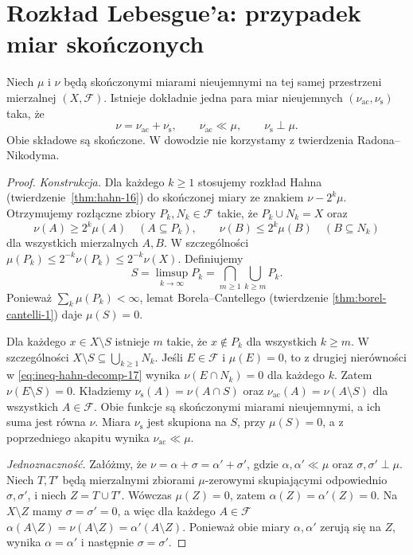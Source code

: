 \section{Rozkład Lebesgue'a: przypadek miar skończonych}
\begin{twierdzenie}
\label{thm:lebesgue-decomp-finite-17}
Niech $\mu$ i $\nu$ będą skończonymi miarami nieujemnymi
na tej samej przestrzeni mierzalnej $(X,\mathcal F)$.
Istnieje dokładnie jedna para miar nieujemnych
$(\nu_{\mathrm{ac}},\nu_{\mathrm{s}})$ taka, że
\begin{equation}\label{eq:decomp-finite-17}
\nu=\nu_{\mathrm{ac}}+\nu_{\mathrm{s}},\qquad
\nu_{\mathrm{ac}}\ll\mu,\qquad \nu_{\mathrm{s}}\perp\mu.
\end{equation}
Obie składowe są skończone. W dowodzie nie korzystamy
z twierdzenia Radona--Nikodyma.
\end{twierdzenie}
\begin{proof}
\emph{Konstrukcja.} Dla każdego $k\ge1$ stosujemy rozkład
Hahna (twierdzenie~\ref{thm:hahn-16}) do skończonej miary
ze znakiem $\nu-2^k\mu$. Otrzymujemy rozłączne zbiory
$P_k,N_k\in\mathcal F$ takie, że
$P_k\cup N_k=X$ oraz
\begin{equation}\label{eq:ineq-hahn-decomp-17}
\nu(A)\ge2^k\mu(A)\quad(A\subseteq P_k),\qquad
\nu(B)\le2^k\mu(B)\quad(B\subseteq N_k)
\end{equation}
dla wszystkich mierzalnych $A,B$. W szczególności
$\mu(P_k)\le2^{-k}\nu(P_k)\le2^{-k}\nu(X)$.
Definiujemy
\[
S=\limsup_{k\to\infty}P_k
  =\bigcap_{m\ge1}\bigcup_{k\ge m}P_k.
\]
Ponieważ $\sum_k\mu(P_k)<\infty$, lemat
Borela--Cantellego (twierdzenie \ref{thm:borel-cantelli-1})
daje $\mu(S)=0$.

Dla każdego $x\in X\setminus S$ istnieje $m$ takie,
że $x\notin P_k$ dla wszystkich $k\ge m$.
W szczególności
$X\setminus S\subseteq\bigcup_{k\ge1}N_k$.
Jeśli $E\in\mathcal F$ i $\mu(E)=0$, to z drugiej
nierówności w \eqref{eq:ineq-hahn-decomp-17} wynika
$\nu(E\cap N_k)=0$ dla każdego $k$.
Zatem $\nu(E\setminus S)=0$.
Kładziemy
$\nu_{\mathrm{s}}(A)=\nu(A\cap S)$ oraz
$\nu_{\mathrm{ac}}(A)=\nu(A\setminus S)$
dla wszystkich $A\in\mathcal F$.
Obie funkcje są skończonymi miarami nieujemnymi,
a ich suma jest równa $\nu$.
Miara $\nu_{\mathrm{s}}$ jest skupiona na $S$,
przy $\mu(S)=0$, a z poprzedniego akapitu
wynika $\nu_{\mathrm{ac}}\ll\mu$.

\emph{Jednoznaczność.} Załóżmy, że
$\nu=\alpha+\sigma=\alpha'+\sigma'$,
gdzie $\alpha,\alpha'\ll\mu$ oraz
$\sigma,\sigma'\perp\mu$. Niech $T,T'$ będą
mierzalnymi zbiorami $\mu$-zerowymi skupiającymi
odpowiednio $\sigma,\sigma'$, i niech $Z=T\cup T'$.
Wówczas $\mu(Z)=0$, zatem $\alpha(Z)=\alpha'(Z)=0$.
Na $X\setminus Z$ mamy $\sigma=\sigma'=0$,
a więc dla każdego $A\in\mathcal F$
$\alpha(A\setminus Z)=\nu(A\setminus Z)=\alpha'(A\setminus Z)$.
Ponieważ obie miary $\alpha,\alpha'$ zerują się na $Z$,
wynika $\alpha=\alpha'$ i następnie $\sigma=\sigma'$.
\end{proof}

